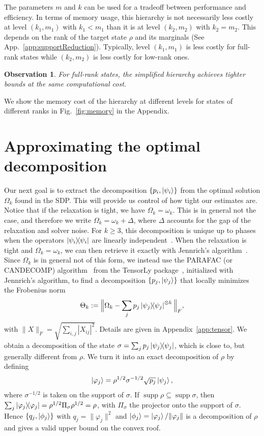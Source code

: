 \documentclass[aps,pra,twocolumn,superscriptaddress]{revtex4-2}
\newtheorem{observation}[theorem]{Observation}
\begin{document}
The parameters $m$ and $k$ can be used for a tradeoff between performance and efficiency. In terms of memory usage, this hierarchy is not necessarily less costly at level $(k_1, m_1)$ with $k_1< m_1$ than it is at level $(k_2, m_2)$ with $k_2 = m_2$. This depends on the rank of the target state $\rho$ and its marginals (See App.~\ref{app:supportReduction}). Typically, level $(k_1, m_1)$ is less costly for full-rank states while $(k_2, m_2)$ is less costly for low-rank ones.

\begin{observation}
   For full-rank states, the simplified hierarchy achieves tighter bounds at the same computational cost.
\end{observation}
We show the memory cost of the hierarchy at different levels for states of different ranks in Fig.~\ref{fig:memory} in the Appendix.

\section{Approximating the optimal decomposition}\label{sec:extractingTheDecomposition}
Our next goal is to extract the decomposition $\{p_i, \ket{\psi_i}\}$ from the optimal solution $\Omega_k$ found in the SDP. This will provide us control of how tight our estimates are. Notice that if the relaxation is tight, we have $\Omega_k = \omega_k$. This is in general not the case, and therefore we write $\Omega_k = \omega_k + \Delta$, where $\Delta$ accounts for the gap of the relaxation and solver noise.
For $k \geq 3$, this decomposition is unique up to phases when the operators $\dyad{\psi_i}$ are linearly independent~\cite{Kruskal1977}. When the relaxation is tight and $\Omega_k = \omega_k$, we can then retrieve it exactly with Jennrich's algorithm~\cite{Harshman1970,Leurgans1993}. Since $\Omega_k$ is in general not of this form, we instead use the PARAFAC (or CANDECOMP) algorithm~\cite{Harshman1970,CarrollChang1970} from the TensorLy package~\cite{tensorly}, initialized with Jennrich's algorithm, to find a decomposition $\{p_j, \ket{\psi_j}\}$ that locally minimizes the Frobenius norm
\begin{equation}
    \Theta_k:=\Big\|\Omega_k - \sum_j p_j \dyad{\psi_j}^{\otimes k}\Big\|_F,
\end{equation}
with $\|X\|_F = \sqrt{\sum_{i,j} |X_{ij}|^2}$. Details are given in Appendix~\ref{app:tensor}.
We obtain a decomposition of the state $\sigma = \sum_j p_j \dyad{\psi_j}$, which is close to, but generally different from $\rho$. We turn it into an exact decomposition of $\rho$ by defining
\begin{equation}\label{eq:repair}
    \ket{\varphi_j} = \rho^{1/2}\sigma^{-1/2}\sqrt{p_j}\ket{\psi_j},
\end{equation}
where $\sigma^{-1/2}$ is taken on the support of $\sigma$. If $\operatorname{supp} \rho \subseteq \operatorname{supp} \sigma$, then $\sum_j \dyad{\varphi_j} = \rho^{1/2}\Pi_\sigma\rho^{1/2} = \rho$, with $\Pi_\sigma$ the projector onto the support of $\sigma$. Hence $\{q_j,\ket{\phi_j}\}$ with $q_j = \|\varphi_j\|^2$ and $\ket{\phi_j}=\ket{\varphi_j}/\|\varphi_j\|$ is a decomposition of $\rho$ and gives a valid upper bound on the convex roof.
\end{document}
